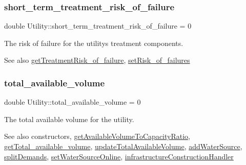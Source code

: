 \subsubsection{\texorpdfstring{short\+\_\+term\+\_\+treatment\+\_\+risk\+\_\+of\+\_\+failure}{short\_term\_treatment\_risk\_of\_failure}}
{\footnotesize\ttfamily double Utility\+::short\+\_\+term\+\_\+treatment\+\_\+risk\+\_\+of\+\_\+failure = 0\hspace{0.3cm}{\ttfamily [private]}}



The risk of failure for the utility\textquotesingle{}s treatment components. 

\begin{DoxySeeAlso}{See also}
\mbox{\hyperlink{classUtility_a1fd8aedeaf56d674fd024dac1f11b20c}{get\+Treatment\+Risk\+\_\+of\+\_\+failure}}, \mbox{\hyperlink{classUtility_aadf42161486c8305b0b55aa65c5f519e}{set\+Risk\+\_\+of\+\_\+failures}} 
\end{DoxySeeAlso}
\mbox{\label{classUtility_a2a6a6a6240acf6e79a210dac604a5c0b}} 
\subsubsection{\texorpdfstring{total\+\_\+available\+\_\+volume}{total\_available\_volume}}
{\footnotesize\ttfamily double Utility\+::total\+\_\+available\+\_\+volume = 0\hspace{0.3cm}{\ttfamily [private]}}



The total available volume for the utility. 

\begin{DoxySeeAlso}{See also}
constructors, \mbox{\hyperlink{classUtility_a70f24df5a7d4346ad0ebccd9b30960d3}{get\+Available\+Volume\+To\+Capacity\+Ratio}}, \mbox{\hyperlink{classUtility_a6128e9ac10cc873773112593b5788d81}{get\+Total\+\_\+available\+\_\+volume}}, \mbox{\hyperlink{classUtility_af394fe9f04a371a7cf10ddadba575e85}{update\+Total\+Available\+Volume}}, \mbox{\hyperlink{classUtility_aebbfd65c13e86cfeda8bdfbcc6712587}{add\+Water\+Source}}, \mbox{\hyperlink{classUtility_aca42b14087c3184d4fec10a2e8729c05}{split\+Demands}}, \mbox{\hyperlink{classUtility_ae01127adf3c99415310e77b22bd9f3b5}{set\+Water\+Source\+Online}}, \mbox{\hyperlink{classUtility_ae93114986578d3d3fbae56f271ac7df6}{infrastructure\+Construction\+Handler}} 
\end{DoxySeeAlso}
\mbox{\label{classUtility_a514f6caff5dc9c36588d376a71b933b7}} 
